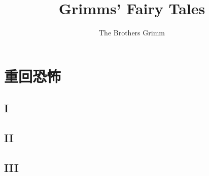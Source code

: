 \documentclass[oneside,11pt]{memoir} %
\title{Grimms' Fairy Tales} %
\author{The Brothers Grimm} %
\begin{document}

\chapter{重回恐怖}


\section*{I}

\section*{II}

\section*{III}

\end{document}
